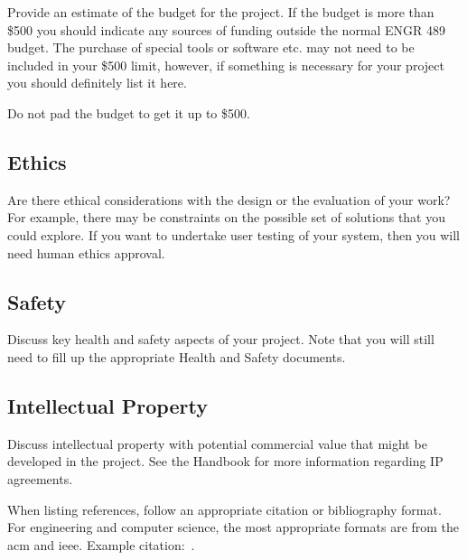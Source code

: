 \documentclass[11pt, a4paper, twoside, openright]{article}
\begin{document}
Provide an estimate of the budget for the project. If the budget is more than \$500 you should indicate any sources of funding outside the normal ENGR 489 budget. The purchase of special tools or software etc. may not need to be included in your \$500 limit, however, if something is necessary for your project you should definitely list it here.

Do not pad the budget to get it up to \$500.

\subsection{Ethics}

Are there ethical considerations with the design or the evaluation of your work? For example, there may be constraints on the possible set of solutions that you could explore. If you want to undertake user testing of your system, then you will need human ethics approval.

\subsection{Safety}

Discuss key health and safety aspects of your project. Note that you will still need to fill up the appropriate Health and Safety documents.


\subsection{Intellectual Property}

Discuss intellectual property with potential commercial value that might be developed in the project. See the Handbook for more information regarding IP agreements.  


%



When listing references, follow an appropriate citation or bibliography format. For engineering and computer science, the most appropriate formats are from the \gls{acm} and \gls{ieee}. Example citation:~\cite{knuth1997art}.
\end{document}
